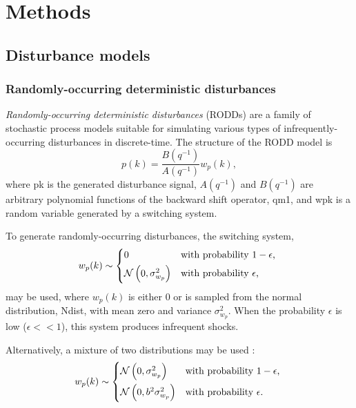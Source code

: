 \chapter{Methods}
\label{chap-methods}


\section{Disturbance models}

\subsection{Randomly-occurring deterministic disturbances}\label{subsec-RODD}

\textit{Randomly-occurring deterministic disturbances} (RODDs) \citep{macgregor_duality_1984} are a family of stochastic process models suitable for simulating various types of infrequently-occurring disturbances in discrete-time.  The structure of the RODD model is
\begin{equation} \label{eq:RODD}
	p(k)= \frac{B(q^{-1})}{A(q^{-1})}w_p(k),
\end{equation}
where \gls{pk} is the generated disturbance signal, $A(q^{-1})$ and $B(q^{-1})$ are arbitrary polynomial functions of the backward shift operator, \gls{qm1}, and \gls{wpk} is a random variable generated by a switching system.

To generate randomly-occurring disturbances, the switching system,
\begin{equation} \label{eq:wpk1}
w_p(k) \sim 
\begin{cases*}
	0 & with probability $1-\epsilon$, \\
	\mathcal{N}\left( 0, \sigma_{w_p}^2 \right) & with probability $\epsilon$,
\end{cases*}
\end{equation}
may be used, where $w_p(k)$ is either 0 or is sampled from the normal distribution, \gls{Ndist}, with mean zero and variance $\sigma_{w_p}^2$.  When the probability $\epsilon$ is low ($\epsilon<<1$), this system produces infrequent shocks.

Alternatively, a mixture of two distributions may be used \citep{robertson_detection_1995}:
\begin{equation} \label{eq:wpk2}
w_p(k) \sim 
	\begin{cases*}
		\mathcal{N}\left(0, \sigma_{w_p}^2\right) & with probability $1-\epsilon$, \\
		\mathcal{N}\left(0, b^2\sigma_{w_p}^2\right) & with probability $\epsilon$.
	\end{cases*}
\end{equation}

